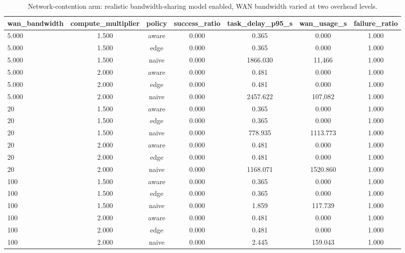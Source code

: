 \begin{table}
\centering
\footnotesize
\caption{Network-contention arm: realistic bandwidth-sharing model enabled, WAN bandwidth varied at two overhead levels.}
\label{tab:p2-network}
\begin{tabular}{lcccccc}
\toprule
wan\_bandwidth & compute\_multiplier & policy & success\_ratio & task\_delay\_p95\_s & wan\_usage\_s & failure\_ratio \\
\midrule
5.000 & 1.500 & aware & 0.000 & 0.365 & 0.000 & 1.000 \\
5.000 & 1.500 & edge & 0.000 & 0.365 & 0.000 & 1.000 \\
5.000 & 1.500 & naive & 0.000 & 1866.030 & 11,466 & 1.000 \\
5.000 & 2.000 & aware & 0.000 & 0.481 & 0.000 & 1.000 \\
5.000 & 2.000 & edge & 0.000 & 0.481 & 0.000 & 1.000 \\
5.000 & 2.000 & naive & 0.000 & 2457.622 & 107,082 & 1.000 \\
20 & 1.500 & aware & 0.000 & 0.365 & 0.000 & 1.000 \\
20 & 1.500 & edge & 0.000 & 0.365 & 0.000 & 1.000 \\
20 & 1.500 & naive & 0.000 & 778.935 & 1113.773 & 1.000 \\
20 & 2.000 & aware & 0.000 & 0.481 & 0.000 & 1.000 \\
20 & 2.000 & edge & 0.000 & 0.481 & 0.000 & 1.000 \\
20 & 2.000 & naive & 0.000 & 1168.071 & 1520.860 & 1.000 \\
100 & 1.500 & aware & 0.000 & 0.365 & 0.000 & 1.000 \\
100 & 1.500 & edge & 0.000 & 0.365 & 0.000 & 1.000 \\
100 & 1.500 & naive & 0.000 & 1.859 & 117.739 & 1.000 \\
100 & 2.000 & aware & 0.000 & 0.481 & 0.000 & 1.000 \\
100 & 2.000 & edge & 0.000 & 0.481 & 0.000 & 1.000 \\
100 & 2.000 & naive & 0.000 & 2.445 & 159.043 & 1.000 \\
\bottomrule
\end{tabular}
\par\vspace{2pt}{\footnotesize\raggedright Unlike the main grids, the simulator's realistic network model is enabled here, so transfers share link bandwidth.\par}
\end{table}
